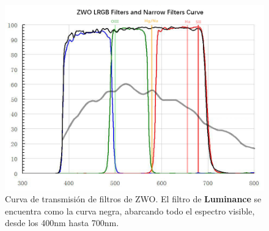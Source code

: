 \begin{figure}[!ht]
	\centering
	\includegraphics[scale=0.6]{Observaciones/Secciones/Figures/ZWO RGBL Transmission Curve.jpg}
	\caption{Curva de transmisión de filtros de ZWO. El filtro de
	\textbf{Luminance} se encuentra como la curva negra, abarcando todo el
	espectro visible, desde los 400nm hasta 700nm.}
	\label{zwoFilterTransmissionCurve}
\end{figure}